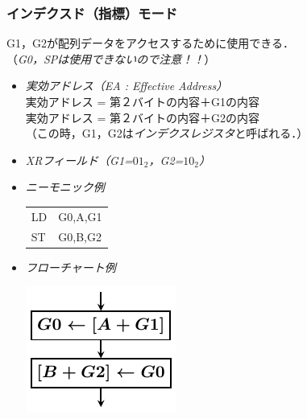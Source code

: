 \documentclass{beamer}                 %
\begin{document}
\begin{frame}
  \frametitle{インデクスド（指標）モード}
  G1，G2が配列データをアクセスするために使用できる．\\
  （\emph{G0，SPは使用できないので注意！！}）
  \vfill
  \begin{itemize}
  \item \emph{実効アドレス（EA : Effective Address）} \\
    実効アドレス = 第２バイトの内容＋G1の内容 \\
    実効アドレス = 第２バイトの内容＋G2の内容 \\
    （この時，G1，G2は\emph{インデクスレジスタ}と呼ばれる．）
    \vfill
  \item \emph{XRフィールド（G1=$01_2$，G2=$10_2$）}
    \vfill
  \item \emph{ニーモニック例} \\
    {\ttfamily\vspace{-0.5cm}\begin{center}
      \begin{tabular}{l l}
        LD & G0,A,G1 \\
        ST & G0,B,G2 \\
      \end{tabular}
    \end{center}}
    \vfill
  \item \emph{フローチャート例} \\
    \vspace{-0.5cm}\centerline{\includegraphics[scale=0.8]{../Tikz/flowF.pdf}}
  \end{itemize}
  \vfill
  \vfill
\end{frame}
\end{document}
